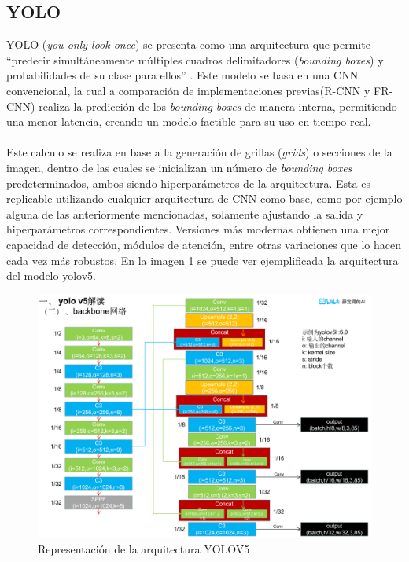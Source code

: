 \subsection{YOLO}
YOLO (\textit{you only look once}) se presenta como una arquitectura que permite ``predecir simultáneamente múltiples cuadros delimitadores (\textit{bounding boxes}) y probabilidades de su clase para ellos'' \cite{Redmon2015}. Este modelo se basa en una CNN convencional, la cual a comparación de implementaciones previas(R-CNN y FR-CNN) realiza la predicción de los \textit{bounding boxes} de manera interna, permitiendo una menor latencia, creando un modelo factible para su uso en tiempo real.\\\\
Este calculo se realiza en base a la generación de grillas (\textit{grids}) o secciones de la imagen, dentro de las cuales se inicializan un número de \textit{bounding boxes} predeterminados, ambos siendo hiperparámetros de la arquitectura. Esta es replicable utilizando cualquier arquitectura de CNN como base, como por ejemplo alguna de las anteriormente mencionadas, solamente ajustando la salida y hiperparámetros correspondientes. Versiones más modernas obtienen una mejor capacidad de detección, módulos de atención, entre otras variaciones que lo hacen cada vez más robustos. En la imagen \ref{YOLO} se puede ver ejemplificada la arquitectura del modelo yolov5.

\begin{figure}[h!]
\includegraphics[width=1\textwidth]{images/yolov5.png}
\centering
\caption{Representación de la arquitectura YOLOV5 \protect\cite{yolov5}}
\label{YOLO}
\end{figure}

